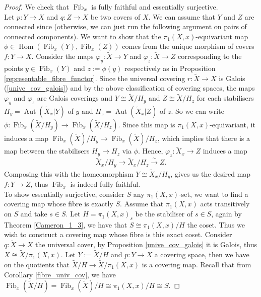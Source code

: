 \documentclass{article}
\theoremstyle{plain}
\theoremstyle{definition}
\DeclareMathOperator{\Hom}{Hom}
\DeclareMathOperator{\Fib}{Fib}
\DeclareMathOperator{\Aut}{Aut}
\begin{document}
\begin{proof}
    We check that $\Fib_x$ is fully faithful and essentially surjective.\\
    Let $p:Y\rightarrow X$ and $q:Z\rightarrow X$ be two covers of $X$.
    We can assume that $Y$ and $Z$ are connected since (otherwise, we can just run the following argument on pairs of connected components).
    We want to show that the $\pi_1(X,x)$-equivariant map $\phi\in\Hom(\Fib_x(Y),\Fib_x(Z))$ comes from the unique morphism of covers $f: Y\rightarrow X$.
    Consider the maps $\varphi_y: \widetilde{X} \rightarrow Y$ and $\varphi_z:\widetilde{X}\rightarrow Z$ corresponding to the points $y\in \Fib_x(Y)$ and $z:=\phi(y)$ respectively as in Proposition \ref{representable_fibre_functor}.
    Since the universal covering $r:\widetilde{X}\rightarrow X$ is Galois (\ref{unive_cov_galois}) and by the above classification of covering spaces, the maps $\varphi_y$ and $\varphi_z$ are Galois coverings and $Y\cong \widetilde{X}/H_y$ and $Z\cong \widetilde{X}/H_z$ for each stabilisers $H_y=\Aut(\widetilde{X}_x|Y)$ of $y$ and $H_z=\Aut(\widetilde{X}_x|Z)$ of $z$.
    So we can write $\phi : \Fib_x (\widetilde{X}/H_y) \rightarrow \Fib_x(\widetilde{X}/H_z)$.
    Since this map is $\pi_1(X,x)$-equivariant, it induces a map $\Fib_x (\widetilde{X})/H_y \rightarrow \Fib_x(\widetilde{X})/H_z$,
    which implies that there is a map between the stabilisers $H_y\rightarrow H_z$ via $\phi$.
    Hence, $\varphi_z: \widetilde{X}_x\rightarrow Z$ induces a map 
    $$\widetilde{X}_x / H_y \rightarrow \widetilde{X}_x/H_z \xrightarrow[]{\sim} Z.$$
    Composing this with the homeomorphism $Y\cong \widetilde{X}_x/H_y$, gives us the desired map$f:Y\rightarrow Z$, thus $\Fib_x$ is indeed fully faithful.\\
    To show essentially surjective, consider $S$ any $\pi_1(X,x)$-set, we want to find a covering map whose fibre is exactly $S$.
    Assume that $\pi_1(X,x)$ acts transitively on $S$ and take $s\in S$. Let $H=\pi_1(X,x)_s$ be the stabiliser of $s\in S$, again by Theorem \ref{Cameron_1_3}, we have that $S\cong \pi_1(X,x)/H$ the coset. 
    Thus we wish to construct a covering map whose fibre is this exact coset.
    Consider $q:\widetilde{X}\rightarrow X$ the universal cover, by Proposition \ref{unive_cov_galois} it is Galois, thus $X \cong \widetilde{X}/\pi_1(X,x)$.
    Let $Y:= \widetilde{X}/H$ and $p:Y\rightarrow X$ a covering space, then we have on the quotients that $\widetilde{X}/H\rightarrow \widetilde{X}/\pi_1(X,x)$ is a covering map.
    Recall that from Corollary \ref{fibre_univ_cov}, we have $\Fib_x(\widetilde{X}/H) =\Fib_x(\widetilde{X})/H \cong \pi_1(X,x)/H \cong S$. 

\end{proof}
\end{document}
